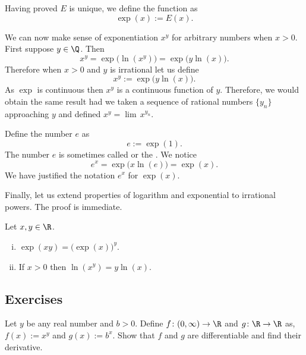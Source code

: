\documentclass[12pt]{book}
\begin{document}
Having proved $E$ is unique, we define the
\emph{} function as
\begin{equation*}
\exp(x) := E(x) .
\end{equation*}

We can now make sense of exponentiation $x^y$ for arbitrary numbers
when $x > 0$.
First suppose $y \in \Q$.
Then
\begin{equation*}
x^y = \exp\bigl(\ln(x^y)\bigr) = \exp\bigl(y\ln(x)\bigr) .
\end{equation*}
Therefore when $x > 0$ and $y$ is irrational let us define
\begin{equation*}
x^y := \exp\bigl(y\ln(x)\bigr) .
\end{equation*}
As $\exp$ is continuous then $x^y$ is a continuous function of $y$.
Therefore, we would
obtain the same result had we taken a sequence of rational numbers $\{ y_n \}$
approaching $y$ and defined $x^y = \lim\, x^{y_n}$.

Define the number $e$ as
\begin{equation*}
e := \exp(1) .
\end{equation*}
The number $e$ is sometimes called \emph{} or
the \emph{}.
We notice 
\begin{equation*}
e^x = \exp\bigl(x \ln(e) \bigr) = \exp(x) .
\end{equation*}
We have justified the notation $e^x$ for $\exp(x)$.

Finally, let us extend properties of logarithm and exponential to
irrational powers.
The proof is immediate.

\begin{prop}
Let $x, y \in \R$.
\begin{enumerate}[(i)]
\item
$\exp(xy) = {\bigl(\exp(x)\bigr)}^y$.
\item
If $x > 0$ then $\ln(x^y) = y \ln (x)$.
\end{enumerate}
\end{prop}

\subsection*{Exercises}

\begin{exercise}
Let $y$ be any real number and $b > 0$.
Define $f \colon (0,\infty) \to \R$
and $g \colon \R \to \R$ as, $f(x) := x^y$ and $g(x) := b^x$.
Show that $f$
and $g$ are differentiable and find their derivative.
\end{exercise}
\end{document}
